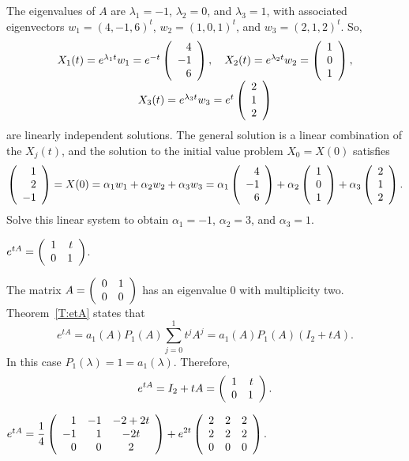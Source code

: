 \documentclass{ximera}
\begin{document}
\soln The eigenvalues of $A$ are $\lambda_1 = -1$, $\lambda_2 = 0$, and
$\lambda_3 = 1$, with associated eigenvectors $w_1 = (4,-1,6)^t$,
$w_2 = (1,0,1)^t$, and $w_3 = (2,1,2)^t$.  So,
\[
\begin{array}{c}
X_1(t) = e^{\lambda_1 t}w_1 = e^{-t}\left(\begin{array}{r} 4 \\ -1 \\ 6\end{array}\right), \quad
X_2(t) = e^{\lambda_2 t}w_2 = \left(\begin{array}{r} 1 \\ 0 \\ 1\end{array}\right), \\
X_3(t) = e^{\lambda_3 t}w_3 = e^t\left(\begin{array}{r} 2 \\ 1 \\ 2\end{array}\right)
\end{array}
\]
are linearly independent solutions.  The general solution is a linear
combination of the $X_j(t)$, and the solution to the initial value
problem $X_0 = X(0)$ satisfies
\[
\left(\begin{array}{r} 1 \\ 2 \\ -1\end{array}\right) = X(0) = \alpha_1w_1 + \alpha_2w_2 + \alpha_3w_3
= \alpha_1\left(\begin{array}{r} 4 \\ -1 \\ 6\end{array}\right) + \alpha_2\left(\begin{array}{r} 1 \\ 0 \\ 1\end{array}\right)
+ \alpha_3\left(\begin{array}{r} 2 \\ 1 \\ 2\end{array}\right).
\]
Solve this linear system to obtain $\alpha_1 = -1$,
$\alpha_2 = 3$, and $\alpha_3 = 1$.

 \ans $e^{tA} = \left(\begin{array}{rr} 1 & t\\ 0 &1\end{array}\right)$.

\soln The matrix $A = \left(\begin{array}{rr} 0 & 1\\ 0 &0\end{array}\right)$ has an eigenvalue $0$ with
multiplicity two.  Theorem~\ref{T:etA} states that 
\[
e^{tA} = a_1(A)P_1(A)\sum_{j=0}^1t^jA^j= a_1(A)P_1(A)(I_2+tA).
\]
In this case $P_1(\lambda)=1=a_1(\lambda)$.   Therefore,
\[
e^{tA} = I_2+tA = \left(\begin{array}{rr} 1 & t\\ 0 &1\end{array}\right).
\]

\newpage
{} \ans $e^{tA}= \displaystyle\frac{1}{4}\left(\begin{array}{rrc} 
1 & -1 & -2+2t\\ -1 & 1 & -2t \\ 0 & 0 & 2\end{array}\right) +e^{2t}\left(\begin{array}{rrr} 2 & 2 & 2\\  2 & 2 & 2 \\ 0 & 0 & 0 
\end{array}\right)$.
\end{document}
